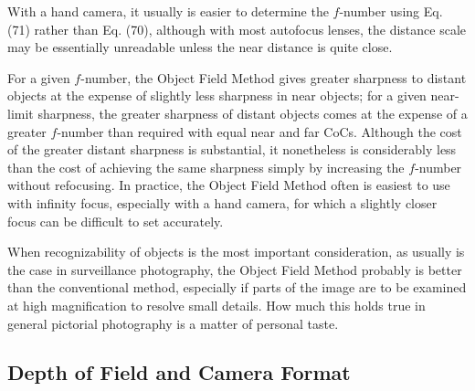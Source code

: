 \documentclass[11pt, oneside]{scrartcl}   	%
\begin{document}
With a hand camera, it usually is easier to determine the $f$-number using Eq. (71) rather than Eq. (70), although with most autofocus lenses, the distance scale may be essentially unreadable unless the near distance is quite close.

For a given $f$-number, the Object Field Method gives greater sharpness to distant objects at the expense of slightly less sharpness in near objects; for a given near-limit sharpness, the greater sharpness of distant objects comes at the expense of a greater $f$-number than required with equal near and far CoCs. Although the cost of the greater distant sharpness is substantial, it nonetheless is considerably less than the cost of achieving the same sharpness simply by increasing the $f$-number without refocusing. In practice, the Object Field Method often is easiest to use with infinity focus, especially with a hand camera, for which a slightly closer focus can be difficult to set accurately.

When recognizability of objects is the most important consideration, as usually is the case in surveillance photography, the Object Field Method probably is better than the conventional method, especially if parts of the image are to be examined at high magnification to resolve small details. How much this holds true in general pictorial photography is a matter of personal taste.

\subsection{Depth of Field and Camera Format}
\end{document}
